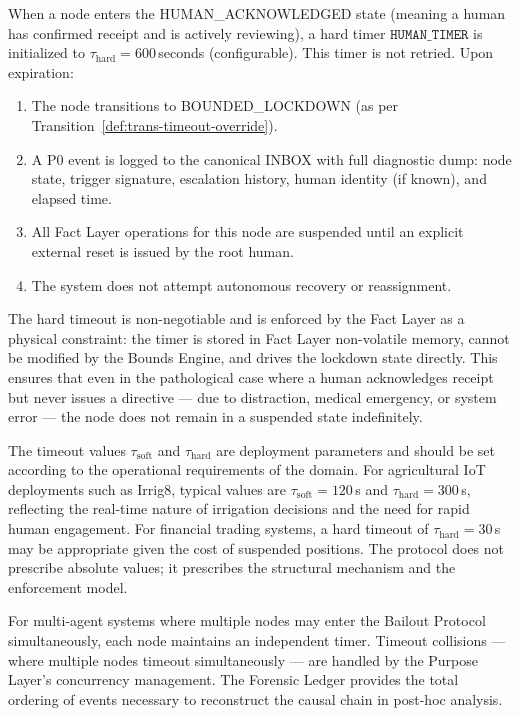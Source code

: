 \begin{definition}
\label{def:hard-timeout}
When a node enters the HUMAN\_ACKNOWLEDGED state (meaning a human has confirmed receipt and is actively reviewing), a hard timer $\texttt{HUMAN\_TIMER}$ is initialized to $\tau_{\text{hard}} = 600\,$seconds (configurable). This timer is not retried. Upon expiration:

\begin{enumerate}[noitemsep]
    \item The node transitions to BOUNDED\_LOCKDOWN (as per Transition~\ref{def:trans-timeout-override}).
    \item A P0 event is logged to the canonical INBOX with full diagnostic dump: node state, trigger signature, escalation history, human identity (if known), and elapsed time.
    \item All Fact Layer operations for this node are suspended until an explicit external reset is issued by the root human.
    \item The system does not attempt autonomous recovery or reassignment.
\end{enumerate}
\end{definition}

The hard timeout is non-negotiable and is enforced by the Fact Layer as a physical constraint: the timer is stored in Fact Layer non-volatile memory, cannot be modified by the Bounds Engine, and drives the lockdown state directly. This ensures that even in the pathological case where a human acknowledges receipt but never issues a directive — due to distraction, medical emergency, or system error — the node does not remain in a suspended state indefinitely.

The timeout values $\tau_{\text{soft}}$ and $\tau_{\text{hard}}$ are deployment parameters and should be set according to the operational requirements of the domain. For agricultural IoT deployments such as Irrig8, typical values are $\tau_{\text{soft}} = 120\,$s and $\tau_{\text{hard}} = 300\,$s, reflecting the real-time nature of irrigation decisions and the need for rapid human engagement. For financial trading systems, a hard timeout of $\tau_{\text{hard}} = 30\,$s may be appropriate given the cost of suspended positions. The protocol does not prescribe absolute values; it prescribes the structural mechanism and the enforcement model.

\begin{note}
For multi-agent systems where multiple nodes may enter the Bailout Protocol simultaneously, each node maintains an independent timer. Timeout collisions — where multiple nodes timeout simultaneously — are handled by the Purpose Layer's concurrency management. The Forensic Ledger provides the total ordering of events necessary to reconstruct the causal chain in post-hoc analysis.
\end{note}

